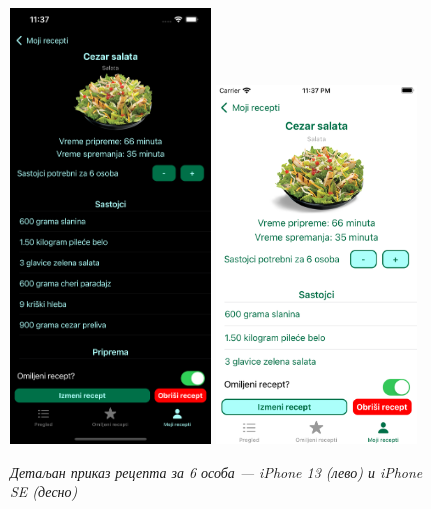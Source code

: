 \documentclass[12pt,oneside]{memoir}
\begin{document}
\begin{figure} [H]
    \centering
    \captionsetup{justification=centering}
    \includegraphics[width=0.475\textwidth]{images/simulators/view images/dark - detail6.png} 
    \hfill
    \includegraphics[width=0.475\textwidth]{images/simulators/view images/light - detail6.png} 
    \caption{\textit{Детаљан приказ рецепта за 6 особа --- iPhone 13 (лево) и iPhone SE (десно)}}
    \label{slika:детаљан_рецепт_2_1}
\end{figure}
\end{document}
